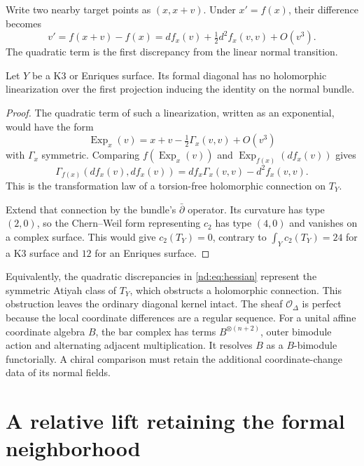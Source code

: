 Write two nearby target points as $(x,x+v)$. Under $x'=f(x)$,
their difference becomes
\begin{equation}\label{nd:eq:hessian}
 v'=f(x+v)-f(x)
    =df_x(v)+\tfrac12d^2f_x(v,v)+O(v^3).
\end{equation}
The quadratic term is the first discrepancy from the linear normal
transition.

\begin{proposition}\label{nd:prop:connection}
Let $Y$ be a K3 or Enriques surface. Its formal diagonal has no
holomorphic linearization over the first projection inducing the
identity on the normal bundle.
\end{proposition}

\begin{proof}
The quadratic term of such a linearization, written as an exponential,
would have the form
\[
 \operatorname{Exp}_x(v)=x+v-\tfrac12\Gamma_x(v,v)+O(v^3)
\]
with $\Gamma_x$ symmetric. Comparing
$f(\operatorname{Exp}_x(v))$ and
$\operatorname{Exp}_{f(x)}(df_x(v))$ gives
\[
 \Gamma_{f(x)}(df_x(v),df_x(v))
       =df_x\Gamma_x(v,v)-d^2f_x(v,v).
\]
This is the transformation law of a torsion-free holomorphic
connection on $T_Y$.

Extend that connection by the bundle's $\bar\partial$ operator.
Its curvature has type $(2,0)$, so the Chern--Weil form representing
$c_2$ has type $(4,0)$ and vanishes on a complex surface.
This would give $c_2(T_Y)=0$, contrary to
$\int_Yc_2(T_Y)=24$ for a K3 surface and $12$ for an Enriques surface.
\end{proof}

Equivalently, the quadratic discrepancies in
\eqref{nd:eq:hessian} represent the symmetric Atiyah class of $T_Y$,
which obstructs a holomorphic connection. This obstruction leaves the
ordinary diagonal kernel intact. The sheaf $\mathcal O_\Delta$ is
perfect because the local coordinate differences are a regular
sequence. For a unital affine coordinate algebra $B$, the bar complex has terms
$B^{\otimes(n+2)}$, outer bimodule action and alternating adjacent
multiplication. It resolves $B$ as a $B$-bimodule functorially.
A chiral comparison must retain the additional coordinate-change data
of its normal fields.

\section{A relative lift retaining the formal neighborhood}
\label{nd:sec:formal}

